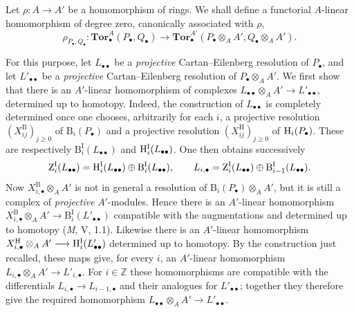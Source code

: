 \begin{env}[6.3.8]
\label{III.6.3.8}
Let $\rho:A\longrightarrow A'$ be a homomorphism of rings.  We
shall define a functorial $A$-linear homomorphism of degree zero,
canonically associated with $\rho$,
\[
  \rho_{P_\bullet,Q_\bullet}:
  \mathbf{Tor}_\bullet^A(P_\bullet,Q_\bullet)
  \longrightarrow
  \mathbf{Tor}_\bullet^{A'}
  (P_\bullet\otimes_AA',Q_\bullet\otimes_AA').
  \tag{6.3.8.1}\label{III.6.3.8.1}
\]

For this purpose, let $L_{\bullet\bullet}$ be a \emph{projective}
Cartan--Eilenberg resolution of $P_\bullet$, and let
$L'_{\bullet\bullet}$ be a \emph{projective} Cartan--Eilenberg resolution
of $P_\bullet\otimes_AA'$.  We first show that there is an
$A'$-linear homomorphism of complexes $L_{\bullet\bullet}\otimes_AA'
\longrightarrow L'_{\bullet\bullet}$,
determined up to homotopy.  Indeed, the construction of
$L_{\bullet\bullet}$ is completely determined once one chooses,
arbitrarily for each $i$, a projective resolution
$(X_{ij}^{\mathrm B})_{j\geq0}$ of $\mathrm B_i(P_\bullet)$ and a
projective resolution $(X_{ij}^{\mathrm H})_{j\geq0}$ of
$\mathrm{H}_i(P_\bullet)$.  These are respectively
$\mathrm B_i^{\mathrm I}(L_{\bullet\bullet})$ and
$\mathrm{H}_i^{\mathrm I}(L_{\bullet\bullet})$.  One then obtains
successively
\[
  \mathrm Z_i^{\mathrm I}(L_{\bullet\bullet})
  =
  \mathrm{H}_i^{\mathrm I}(L_{\bullet\bullet})
  \oplus
  \mathrm B_i^{\mathrm I}(L_{\bullet\bullet}),
  \qquad
  L_{i,\bullet}
  =
  \mathrm Z_i^{\mathrm I}(L_{\bullet\bullet})
  \oplus
  \mathrm B_{i-1}^{\mathrm I}(L_{\bullet\bullet}).
\]
Now $X_{i,\bullet}^{\mathrm B}\otimes_AA'$ is not in general a
resolution of $\mathrm B_i(P_\bullet)\otimes_AA'$, but it is still
a complex of \emph{projective} $A'$-modules.  Hence there is an
$A'$-linear homomorphism $X_{i,\bullet}^{\mathrm B}\otimes_A A'
\to\mathrm B_i^{\mathrm I}(L'_{\bullet\bullet})$
compatible with the augmentations and determined up to homotopy
(\emph{M}, V, 1.1).  Likewise there is an $A'$-linear homomorphism $X_{i,\bullet}^{\mathrm H}\otimes_AA'
\longrightarrow
\mathrm{H}_i^{\mathrm I}(L'_{\bullet\bullet})$
determined up to homotopy.  By the construction just recalled,
these maps give, for every $i$, an $A'$-linear homomorphism $L_{i,\bullet}\otimes_AA'\longrightarrow L'_{i,\bullet}$.
For $i\in\mathbb Z$ these homomorphisms are compatible with the
differentials $L_{i,\bullet}\longrightarrow L_{i-1,\bullet}$ and
their analogues for $L'_{\bullet\bullet}$; together they therefore
give the required homomorphism
$L_{\bullet\bullet}\otimes_AA'\longrightarrow L'_{\bullet\bullet}$.


\end{env}

